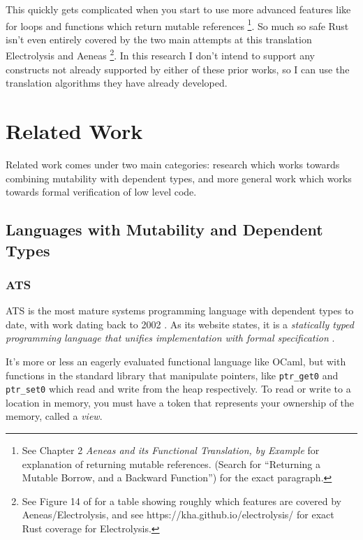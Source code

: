 \documentclass[12pt,twoside]{report}
\begin{document}
This quickly gets complicated when you start to use more advanced features like for loops and functions which return mutable references \footnote{See \citep{aeneas} Chapter 2 \textit{Aeneas and its Functional Translation, by Example} for explanation of returning mutable references. (Search for ``Returning a Mutable Borrow, and a Backward Function'') for the exact paragraph.}. So much so safe Rust isn't even entirely covered by the two main attempts at this translation Electrolysis \citep{ullrich_khaelectrolysis_2024} and Aeneas \citep{aeneas} \footnote{See Figure 14 of \citep{aeneas} for a table showing roughly which features are covered by Aeneas/Electrolysis, and see https://kha.github.io/electrolysis/ for exact Rust coverage for Electrolysis.}. In this research I don't intend to support any constructs not already supported by either of these prior works, so I can use the translation algorithms they have already developed.

\section{Related Work}
Related work comes under two main categories: research which works towards combining mutability with dependent types, and more general work which works towards formal verification of low level code.

\subsection{Languages with Mutability and Dependent Types}

\subsubsection{ATS}
ATS \citep{xi_applied_2017} is the most mature systems programming language with dependent types to date, with work dating back to 2002 \citep{ATSImplements}. As its website states, it is a \textit{statically typed programming language that unifies implementation with formal specification} \citep{ATSHome}.

It's more or less an eagerly evaluated functional language like OCaml, but with functions in the standard library that manipulate pointers, like \verb|ptr_get0| and \verb|ptr_set0| which read and write from the heap respectively. To read or write to a location in memory, you must have a token that represents your ownership of the memory, called a \textit{view}.
\end{document}
